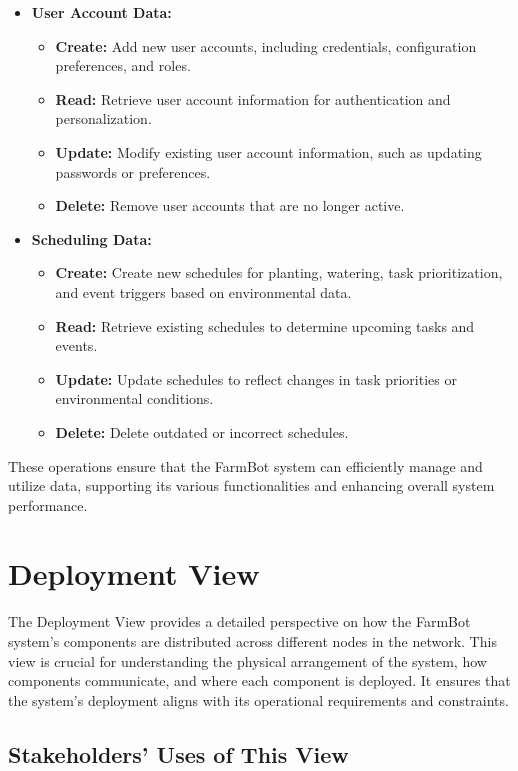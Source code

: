 \begin{itemize}
    \item \textbf{User Account Data:}
    \begin{itemize}
        \item \textbf{Create:} Add new user accounts, including credentials, configuration preferences, and roles.
        \item \textbf{Read:} Retrieve user account information for authentication and personalization.
        \item \textbf{Update:} Modify existing user account information, such as updating passwords or preferences.
        \item \textbf{Delete:} Remove user accounts that are no longer active.
    \end{itemize}
    
    \item \textbf{Scheduling Data:}
    \begin{itemize}
        \item \textbf{Create:} Create new schedules for planting, watering, task prioritization, and event triggers based on environmental data.
        \item \textbf{Read:} Retrieve existing schedules to determine upcoming tasks and events.
        \item \textbf{Update:} Update schedules to reflect changes in task priorities or environmental conditions.
        \item \textbf{Delete:} Delete outdated or incorrect schedules.
    \end{itemize}
\end{itemize}

These operations ensure that the FarmBot system can efficiently manage and utilize data, supporting its various functionalities and enhancing overall system performance.

\section{Deployment View}

The Deployment View provides a detailed perspective on how the FarmBot system's components are distributed across different nodes in the network. This view is crucial for understanding the physical arrangement of the system, how components communicate, and where each component is deployed. It ensures that the system's deployment aligns with its operational requirements and constraints.

\subsection{Stakeholders’ Uses of This View}

